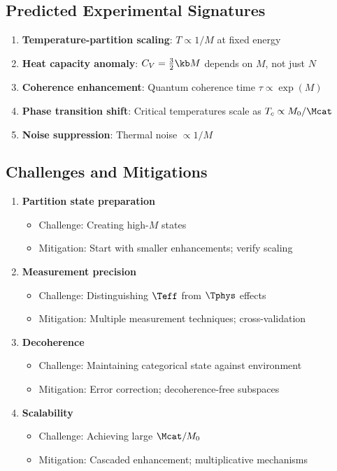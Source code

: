 \subsection{Predicted Experimental Signatures}

\begin{enumerate}
    \item \textbf{Temperature-partition scaling}: $T \propto 1/M$ at fixed energy

    \item \textbf{Heat capacity anomaly}: $C_V = \frac{3}{2}\kb M$ depends on $M$, not just $N$

    \item \textbf{Coherence enhancement}: Quantum coherence time $\tau \propto \exp(M)$

    \item \textbf{Phase transition shift}: Critical temperatures scale as $T_c \propto M_0/\Mcat$

    \item \textbf{Noise suppression}: Thermal noise $\propto 1/M$
\end{enumerate}

\subsection{Challenges and Mitigations}

\begin{enumerate}
    \item \textbf{Partition state preparation}
    \begin{itemize}
        \item Challenge: Creating high-$M$ states
        \item Mitigation: Start with smaller enhancements; verify scaling
    \end{itemize}

    \item \textbf{Measurement precision}
    \begin{itemize}
        \item Challenge: Distinguishing $\Teff$ from $\Tphys$ effects
        \item Mitigation: Multiple measurement techniques; cross-validation
    \end{itemize}

    \item \textbf{Decoherence}
    \begin{itemize}
        \item Challenge: Maintaining categorical state against environment
        \item Mitigation: Error correction; decoherence-free subspaces
    \end{itemize}

    \item \textbf{Scalability}
    \begin{itemize}
        \item Challenge: Achieving large $\Mcat/M_0$
        \item Mitigation: Cascaded enhancement; multiplicative mechanisms
    \end{itemize}
\end{enumerate}

